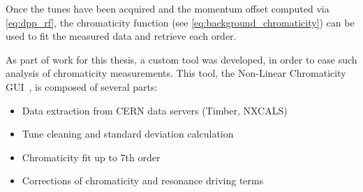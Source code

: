 Once the tunes have been acquired and the momentum offset computed via \cref{eq:dpp_rf}, the
chromaticity function (see \cref{eq:background_chromaticity}) can be used to fit the
measured data and retrieve each order.

As part of work for this thesis, a custom tool was developed, in order to ease such analysis of
chromaticity measurements. This tool, the Non-Linear Chromaticity
GUI~\cite{m_le_garrec_non-linear_2022}, is composed of several parts:

\begin{itemize}
    \tightlist
    \item Data extraction from CERN data servers (Timber, NXCALS)
    \item Tune cleaning and standard deviation calculation
    \item Chromaticity fit up to 7th order
    \item Corrections of chromaticity and resonance driving terms
\end{itemize}